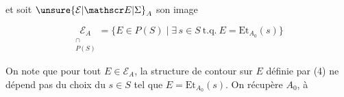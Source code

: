 et soit $\unsure{\mathcal E|\mathscr E|\Sigma}_A$ son image

\[
 \underset{\substack{\cap\\P(S)}}{\mathcal E_A}=\{E\in P(S)\mid\exists\,s\in S\ \text{t.q.}\ E=\mathrm{Et}_{A_0}(s)\} \tag*{(7)}
\]

On note que pour tout $E\in\mathcal E_A$, la structure de contour
sur $E$ définie par (4) ne dépend pas du choix du $s\in S$ tel que $E=\mathrm{Et}_{A_0}(s)$. On récupère $A_0$, à

